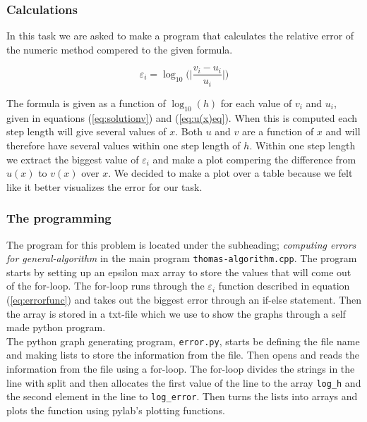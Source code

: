 \documentclass{article}
\begin{document}
  \subsubsection{Calculations}

    In this task we are asked to make a program that calculates the relative error of the numeric method compered to the given formula.

    \begin{equation}
      \varepsilon_i = \log_{10} \bigg( \bigg| \frac{v_i - u_i}{u_i} \bigg| \bigg)    \label{eq:errorfunc}
    \end{equation}

    The formula is given as a function of $\log_{10}(h)$ for each value of $v_i$ and $u_i$, given in equations (\ref{eq:solutionv}) and (\ref{eq:u(x)eq}). When this is computed each step length will give several values of $x$. Both $u$ and $v$ are a function of $x$ and will therefore have several values within one step length of $h$. Within one step length we extract the biggest value of $\varepsilon_i$ and make a plot compering the difference from $u(x)$ to $v(x)$ over $x$. We decided to make a plot over a table because we felt like it better visualizes the error for our task.


  \subsubsection{The programming}

    The program for this problem is located under the subheading; \textit{computing errors for general-algorithm} in the main program \texttt{thomas-algorithm.cpp}. The program starts by setting up an epsilon max array to store the values that will come out of the for-loop. The for-loop runs through the $\varepsilon_i$ function described in equation (\ref{eq:errorfunc}) and takes out the biggest error through an if-else statement. Then the array is stored in a txt-file which we use to show the graphs through a self made python program. \\

    The python graph generating program, \texttt{error.py}, starts be defining the file name and making lists to store the information from the file. Then opens and reads the information from the file using a for-loop. The for-loop divides the strings in the line with split and then allocates the first value of the line to the array \texttt{log\_h} and the second element in the line to \texttt{log\_error}. Then turns the lists into arrays and plots the function using pylab's plotting functions.
\end{document}
